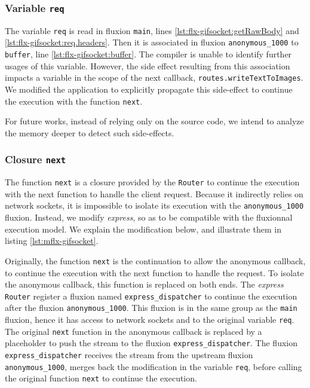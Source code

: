 \subsubsection{Variable \texttt{req}}

The variable \texttt{req} is read in fluxion \texttt{main}, lines \ref{lst:flx-gifsocket:getRawBody} and \ref{lst:flx-gifsocket:req.headers}.
Then it is associated in fluxion \texttt{anonymous\_1000} to \texttt{buffer}, line \ref{lst:flx-gifsocket:buffer}.
The compiler is unable to identify further usages of this variable.
However, the side effect resulting from this association impacts a variable in the scope of the next callback, \texttt{routes.writeTextToImages}.
We modified the application to explicitly propagate this side-effect to continue the execution with the function \texttt{next}.

For future works, instead of relying only on the source code, we intend to analyze the memory deeper to detect such side-effects.

\subsubsection{Closure \texttt{next}}

The function \texttt{next} is a closure provided by the \texttt{Router} to continue the execution with the next function to handle the client request.
Because it indirectly relies on network sockets, it is impossible to isolate its execution with the \texttt{anonymous\-\_1000} fluxion.
Instead, we modify \textit{express}, so as to be compatible with the fluxionnal execution model.
We explain the modification below, and illustrate them in listing \ref{lst:mflx-gifsocket}.

Originally, the function \texttt{next} is the continuation to allow the anonymous callback, to continue the execution with the next function to handle the request.
To isolate the anonymous callback, this function is replaced on both ends.
The \textit{express} \texttt{Router} register a fluxion named \texttt{express\_dispatcher} to continue the execution after the fluxion \texttt{anonymous\-\_1000}.
This fluxion is in the same group as the \texttt{main} fluxion, hence it has access to network sockets and to the original variable \texttt{req}.
The original \texttt{next} function in the anonymous callback is replaced by a placeholder to push the stream to the fluxion \texttt{express\_dispatcher}.
The fluxion \texttt{express\_dispatcher} receives the stream from the upstream fluxion \texttt{anonymous\-\_1000}, merges back the modification in the variable \texttt{req}, before calling the original function \texttt{next} to continue the execution.

